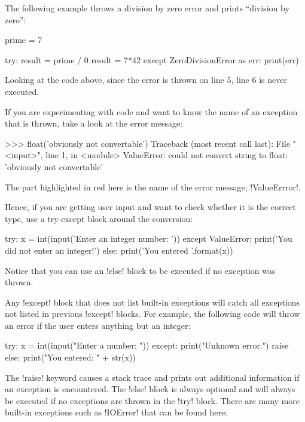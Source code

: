 \documentclass[11pt]{cselabheader}
\begin{document}
The following example throws a division by zero error and prints ``division by
zero'':

\begin{python3code}
prime = 7

try:
    result = prime / 0
    result = 7*42
except ZeroDivisionError as err:
    print(err)
\end{python3code}

Looking at the code above, since the error is thrown on line 5, line 6 is never
executed.

If you are experimenting with code and want to know the name of an exception
that is thrown, take a look at the error message:

\begin{pyconcode}
>>> float('obviously not convertable')
Traceback (most recent call last):
  File "<input>", line 1, in <module>
ValueError: could not convert string to float: 'obviously not convertable'
\end{pyconcode}

The part highlighted in red here is the name of the error message,
\pythoninline!ValueErrror!.

Hence, if you are getting user input and want to check whether it is the correct
type, use a try-except block around the conversion:

\begin{python3code}
try:
    x = int(input('Enter an integer number: '))
except ValueError:
    print('You did not enter an integer!')
else:
    print('You entered {}'.format(x))
\end{python3code}

Notice that you can use an \pythoninline!else! block to be executed if no
exception was thrown.

Any \pythoninline!except!  block that does not list built-in
exceptions will catch all exceptions not listed in previous
\pythoninline!except! blocks.  For example, the following code will throw an
error if the user enters anything but an integer:

\begin{python3code}
try:
    x = int(input("Enter a number: "))
except:
    print("Unknown error.")
    raise
else:
    print("You entered: " + str(x))
\end{python3code}

The \pythoninline!raise! keyword causes a stack trace and prints out additional
information if an exception is encountered.  The \pythoninline!else! block is
always optional and will always be executed if no exceptions are thrown in the
\pythoninline!try! block.  There are many more built-in exceptions such as
\pythoninline!IOError! that can be found here:
\end{document}
